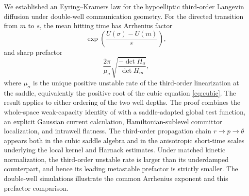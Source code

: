 \documentclass[11pt]{article}
\numberwithin{equation}{section}
\theoremstyle{plain}
\theoremstyle{definition}
\theoremstyle{remark}
\newcommand{\eps}{\varepsilon}
\begin{document}
We established an Eyring--Kramers law for the hypoelliptic third-order
Langevin diffusion under double-well communication geometry.  For the
directed transition from $m$ to $s$, the mean hitting time has Arrhenius
factor
\[
\exp\!\left(\frac{U(\sigma)-U(m)}{\eps}\right),
\]
and sharp prefactor
\[
\frac{2\pi}{\mu_\sigma}
\sqrt{\frac{-\det H_\sigma}{\det H_m}},
\]
where $\mu_\sigma$ is the unique positive unstable rate of the third-order
linearization at the saddle, equivalently the positive root of the cubic
equation \eqref{eq:cubic}.  The result applies to either ordering of the two
well depths.
The proof combines the whole-space weak-capacity identity of
\cite{HeLiWangZhu2026WeakEquilibrium} with a saddle-adapted global test
function, an explicit Gaussian current calculation, Hamiltonian-sublevel
committor localization, and intrawell flatness.  The third-order propagation
chain $r\to p\to\theta$ appears both in the cubic saddle algebra and in the
anisotropic short-time scales underlying the local kernel and Harnack
estimates.  Under matched kinetic normalization, the third-order unstable
rate is larger than its underdamped counterpart, and hence its leading
metastable prefactor is strictly smaller.  The double-well simulations
illustrate the common Arrhenius exponent and this prefactor comparison.

\clearpage
\appendix
\end{document}
